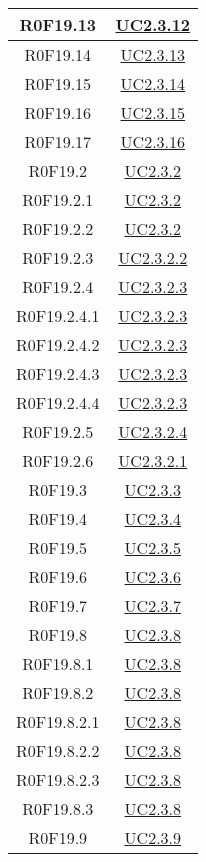 \documentclass[../AnalisiDeiRequisiti.tex]{subfiles}
\begin{document}
\begin{longtable}{|c|c|}
	R0F19.13 & \hyperlink{UC2.3.12}{UC2.3.12}\\\hline
	R0F19.14 & \hyperlink{UC2.3.13}{UC2.3.13}\\\hline
	R0F19.15 & \hyperlink{UC2.3.14}{UC2.3.14}\\\hline
	R0F19.16 & \hyperlink{UC2.3.15}{UC2.3.15}\\\hline
	R0F19.17 & \hyperlink{UC2.3.16}{UC2.3.16}\\\hline
	R0F19.2 & \hyperlink{UC2.3.2}{UC2.3.2}\\\hline
	R0F19.2.1 & \hyperlink{UC2.3.2}{UC2.3.2}\\\hline
	R0F19.2.2 & \hyperlink{UC2.3.2}{UC2.3.2}\\\hline
	R0F19.2.3 & \hyperlink{UC2.3.2.2}{UC2.3.2.2}\\\hline
	R0F19.2.4 & \hyperlink{UC2.3.2.3}{UC2.3.2.3}\\\hline
	R0F19.2.4.1 & \hyperlink{UC2.3.2.3}{UC2.3.2.3}\\\hline
	R0F19.2.4.2 & \hyperlink{UC2.3.2.3}{UC2.3.2.3}\\\hline
	R0F19.2.4.3 & \hyperlink{UC2.3.2.3}{UC2.3.2.3}\\\hline
	R0F19.2.4.4 & \hyperlink{UC2.3.2.3}{UC2.3.2.3}\\\hline
	R0F19.2.5 & \hyperlink{UC2.3.2.4}{UC2.3.2.4}\\\hline
	R0F19.2.6 & \hyperlink{UC2.3.2.1}{UC2.3.2.1}\\\hline
	R0F19.3 & \hyperlink{UC2.3.3}{UC2.3.3}\\\hline
	R0F19.4 & \hyperlink{UC2.3.4}{UC2.3.4}\\\hline
	R0F19.5 & \hyperlink{UC2.3.5}{UC2.3.5}\\\hline
	R0F19.6 & \hyperlink{UC2.3.6}{UC2.3.6}\\\hline
	R0F19.7 & \hyperlink{UC2.3.7}{UC2.3.7}\\\hline
	R0F19.8 & \hyperlink{UC2.3.8}{UC2.3.8}\\\hline
	R0F19.8.1 & \hyperlink{UC2.3.8}{UC2.3.8}\\\hline
	R0F19.8.2 & \hyperlink{UC2.3.8}{UC2.3.8}\\\hline
	R0F19.8.2.1 & \hyperlink{UC2.3.8}{UC2.3.8}\\\hline
	R0F19.8.2.2 & \hyperlink{UC2.3.8}{UC2.3.8}\\\hline
	R0F19.8.2.3 & \hyperlink{UC2.3.8}{UC2.3.8}\\\hline
	R0F19.8.3 & \hyperlink{UC2.3.8}{UC2.3.8}\\\hline
	R0F19.9 & \hyperlink{UC2.3.9}{UC2.3.9}\\\hline

\end{longtable}
\end{document}
